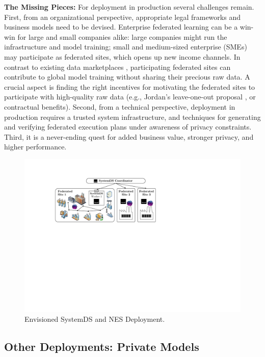 \documentclass[sigconf,screen]{acmart}
\begin{document}
\textbf{The Missing Pieces:} For deployment in production several challenges remain. First, from an organizational perspective, appropriate legal frameworks and business models need to be devised. Enterprise federated learning can be a win-win for large and small companies alike: large companies might run the infrastructure and model training; small and medium-sized enterprise (SMEs) may participate as federated sites, which opens up new income channels. In contrast to existing data marketplaces \cite{FruhwirthRP20}, participating federated sites can contribute to global model training without sharing their precious raw data. A crucial aspect is finding the right incentives for motivating the federated sites to participate with high-quality raw data (e.g., Jordan's leave-one-out proposal \cite{sysml}, or contractual benefits). Second, from a technical perspective, deployment in production requires a trusted system infrastructure, and techniques for generating and verifying federated execution plans under awareness of privacy constraints. Third, it is a never-ending quest for added business value, stronger privacy, and higher performance.

\begin{figure}[!t]
	\centering
	\includegraphics[scale=0.42]{figures/fig04}
	\vspace{-0.25cm}
	\caption{\label{fig:deployment}Envisioned SystemDS and NES Deployment.}
\end{figure}

\subsection{Other Deployments: Private Models}
\end{document}
